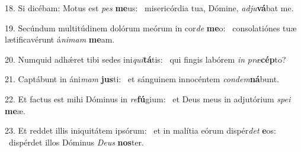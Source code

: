 18. Si dicébam: Motus est \textit{pes} \textbf{me}us: \ast\  misericórdia tua, Dómine, \textit{ad}\textit{ju}\textbf{vá}bat me.\

19. Secúndum multitúdinem dolórum meórum in cor\textit{de} \textbf{me}o: \ast\  consolatiónes tuæ lætificavérunt á\textit{ni}\textit{mam} \textbf{me}am.\

20. Numquid adhǽret tibi sedes ini\textit{qui}\textbf{tá}tis: \ast\  qui fingis labórem \textit{in} \textit{præ}\textbf{cép}to?\

21. Captábunt in áni\textit{mam} \textbf{jus}ti: \ast\  et sánguinem innocéntem \textit{con}\textit{dem}\textbf{ná}bunt.\

22. Et factus est mihi Dóminus in \textit{re}\textbf{fú}gium: \ast\  et Deus meus in adjutórium \textit{spe}\textit{i} \textbf{me}æ.\

23. Et reddet illis iniquitátem ipsórum: \dag\  et in malítia eórum dispér\textit{det} \textbf{e}os: \ast\  dispérdet illos Dóminus \textit{De}\textit{us} \textbf{nos}ter.\

